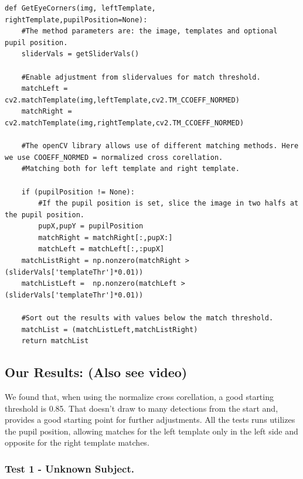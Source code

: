 \begin{verbatim}
def GetEyeCorners(img, leftTemplate, rightTemplate,pupilPosition=None):
    #The method parameters are: the image, templates and optional pupil position.
    sliderVals = getSliderVals()

    #Enable adjustment from slidervalues for match threshold. 
    matchLeft = cv2.matchTemplate(img,leftTemplate,cv2.TM_CCOEFF_NORMED)
    matchRight = cv2.matchTemplate(img,rightTemplate,cv2.TM_CCOEFF_NORMED)

    #The openCV library allows use of different matching methods. Here we use COOEFF_NORMED = normalized cross corellation.
    #Matching both for left template and right template.

    if (pupilPosition != None):
        #If the pupil position is set, slice the image in two halfs at the pupil position. 
        pupX,pupY = pupilPosition
        matchRight = matchRight[:,pupX:]
        matchLeft = matchLeft[:,:pupX]
    matchListRight = np.nonzero(matchRight > (sliderVals['templateThr']*0.01))
    matchListLeft =  np.nonzero(matchLeft > (sliderVals['templateThr']*0.01))

    #Sort out the results with values below the match threshold.
    matchList = (matchListLeft,matchListRight)
    return matchList
\end{verbatim}
\subsection{Our Results: (Also see video)}

We found that, when using the normalize cross corellation, a good
starting threshold is 0.85. That doesn't draw to many detections from
the start and, provides a good starting point for further adjustments.
All the tests runs utilizes the pupil position, allowing matches for the
left template only in the left side and opposite for the right template
matches.

\subsubsection{Test 1 - Unknown Subject.}

